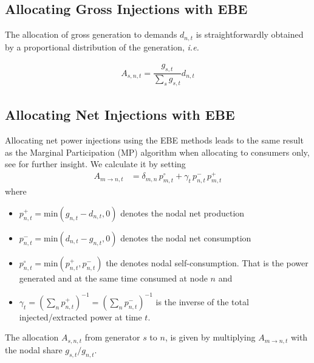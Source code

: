 \documentclass[11pt,twocolumn]{article}
\newcommand{\ie}{\textit{i.e.} }
\newcommand{\generation}{g_{s,t}}
\newcommand{\nodalgeneration}[1][n]{g_{#1,t}}
\newcommand{\demand}[1][n]{d_{#1,t}}
\newcommand{\nodaldemand}[1][n]{d_{#1,t}}
\newcommand{\injection}[1][n]{p_{#1,t}}
\newcommand{\netconsumption}[1][n]{p^{-}_{#1,t}}
\newcommand{\netproduction}[1][n]{p^{+}_{#1,t}}
\newcommand{\selfconsumption}[1][n]{p^{\circ}_{#1,t}}
\newcommand{\allocategeneration}[1][s, n]{A_{#1,t}}
\newcommand{\allocatepeer}[1][m \rightarrow n]{A_{#1,t}}
\begin{document}
\subsection{Allocating Gross Injections with EBE}
\label{sec:gross_ebe}

The allocation of gross generation to demands $\demand$ is straightforwardly obtained by a proportional distribution of the generation, \ie

\begin{align}
    \allocategeneration = \dfrac{\generation}{\sum_s \generation} \demand 
\end{align}


\subsection{Allocating Net Injections with EBE}
\label{sec:net_ebe}

Allocating net power injections using the EBE methods leads to the same result as the Marginal Participation (MP) \cite{rudnick_marginal_1995}  algorithm when allocating to consumers only, see \cite{hofmann_flow_2020-1} for further insight. We calculate it by setting 
\begin{align}
\allocatepeer &=  \delta_{m,n}\,\selfconsumption[m] + \gamma_t \, \netconsumption  \, \netproduction[m]
\label{eq:mp_slack}
\end{align}
where 
\begin{itemize}
\item $\netproduction = \text{min}\left( \nodalgeneration - \nodaldemand , 0 \right) $ denotes the nodal net production 
\item $\netconsumption = \text{min}\left( \nodaldemand  - \nodalgeneration, 0 \right)$ denotes the nodal net consumption
\item $\selfconsumption = \text{min}\left( \netproduction, \netconsumption \right)$ the denotes  nodal self-consumption. That is the power generated and at the same time consumed at node $n$ and 
\item $\gamma_t = \left( \sum_n \netproduction\right) ^{-1} = \left( \sum_n \netconsumption\right) ^{-1}$ is the inverse of the total injected/extracted power at time $t$.
\end{itemize}

The allocation $\allocategeneration$ from generator $s$ to $n$, is given by multiplying $\allocatepeer$ with the nodal share $\generation / \nodalgeneration$.
\end{document}
